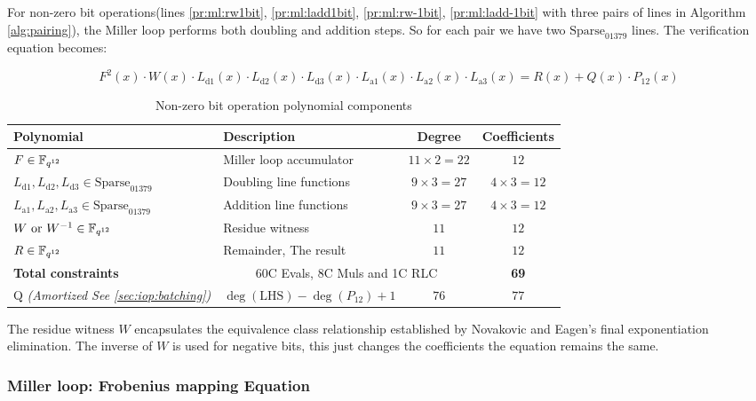 For non-zero bit operations(lines \ref{pr:ml:rw1bit}, \ref{pr:ml:ladd1bit}, \ref{pr:ml:rw-1bit}, \ref{pr:ml:ladd-1bit} with three pairs of lines in Algorithm \ref{alg:pairing}), the Miller loop performs both doubling and addition steps. So for each pair we have two $\text{Sparse}_{01379}$ lines. The verification equation becomes:

\begin{equation}\label{eq:op:n0b}
F^2(x) \cdot W(x) \cdot L_{\text{d1}}(x) \cdot L_{\text{d2}}(x) \cdot L_{\text{d3}}(x) \cdot L_{\text{a1}}(x) \cdot L_{\text{a2}}(x) \cdot L_{\text{a3}}(x) = R(x) + Q(x) \cdot P_{12}(x)
\end{equation}

\begin{table}[h]
\centering
\begin{tabular}{|l|l|c|c|}
\hline
\textbf{Polynomial} & \textbf{Description} & \textbf{Degree} & \textbf{Coefficients} \\
\hline
$F \in \mathbb{F}_{q^{12}}$ & Miller loop accumulator & $11 \times 2 = 22$ & $12$ \\
\hline
$L_{\text{d1}}, L_{\text{d2}}, L_{\text{d3}} \in \text{Sparse}_{01379}$ & Doubling line functions & $9 \times 3 = 27$ & $4 \times 3 = 12$ \\
\hline
$L_{\text{a1}}, L_{\text{a2}}, L_{\text{a3}} \in \text{Sparse}_{01379}$ & Addition line functions & $9 \times 3 = 27$ & $4 \times 3 = 12$ \\\hline
$W \text{ or } W^{-1} \in \mathbb{F}_{q^{12}}$ & Residue witness & $11$ & $12$ \\
\hline
$R \in \mathbb{F}_{q^{12}}$ & Remainder, The result & $11$ & $12$ \\
\hline
\textbf{Total constraints} & \multicolumn{2}{|c|}{60C Evals, 8C Muls and 1C RLC} & \textbf{69} \\
\hline
Q \textit{(Amortized See \ref{sec:iop:batching})} & $\deg(\text{LHS}) - \deg(P_{12}) + 1$ & $76$ & $77$ \\
\hline
\end{tabular}
\caption{Non-zero bit operation polynomial components}\label{tbl:op:ml-nzbit}
\end{table}

The residue witness $W$ encapsulates the equivalence class relationship established by Novakovic and Eagen's final exponentiation elimination.
The inverse of $W$ is used for negative bits, this just changes the coefficients the equation remains the same.

\subsubsection{Miller loop: Frobenius mapping Equation}\label{sec:op:ml-frob}

